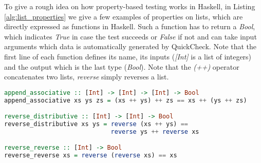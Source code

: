 To give a rough idea on how property-based testing works in Haskell, in Listing \ref{alg:list_properties} we give a few examples of properties on lists, which are directly expressed as functions in Haskell. Such a function has to return a \textit{Bool}, which indicates \textit{True} in case the test succeeds or \textit{False} if not and can take input arguments which data is automatically generated by QuickCheck. Note that the first line of each function defines its name, its inputs (\textit{[Int]} is a list of integers) and the output which is the last type (\textit{Bool}). Note that the \textit{(++)} operator concatenates two lists, \textit{reverse} simply reverses a list.
\begin{lstlisting}[language=Haskell, caption={Examples of properties of lists, expressed in Haskell code.}]
append_associative :: [Int] -> [Int] -> [Int] -> Bool
append_associative xs ys zs = (xs ++ ys) ++ zs == xs ++ (ys ++ zs)

reverse_distributive :: [Int] -> [Int] -> Bool
reverse_distributive xs ys = reverse (xs ++ ys) == 
                             reverse ys ++ reverse xs

reverse_reverse :: [Int] -> Bool
reverse_reverse xs = reverse (reverse xs) == xs
\end{lstlisting}
\label{alg:list_properties}

%
%
%

